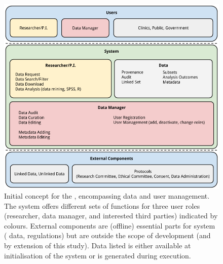 \begin{figure}[h]
	\centering
	\includegraphics[width=1.0\linewidth]{images/brainstorm-before}
	\caption{
		Initial concept for the \ivfsystem{}, encompassing data and user management. 
		The system offers different sets of functions for three user roles (researcher, data manager, and interested third parties) indicated by colours. 
		External components are (offline) essential parts for system (\eg{} data, regulations) but are outside the scope of development (and by extension of this study).
		Data listed is either available at initialisation of the system or is generated during execution.
	}
	\label{fig:brainstorm-before}
\end{figure}